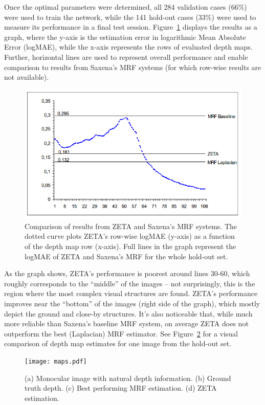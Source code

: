 \documentclass[twocolumn, 9pt]{jsproceedings}
\begin{document}
Once the optimal parameters were determined, all 284 validation cases (66\%) were used to train the network, while the 141 hold-out cases (33\%) were used to measure its performance in a final test session. Figure~\ref{fig:zeta} displays the results as a graph, where the y-axis is the estimation error in logarithmic Mean Absolute Error (logMAE), while the x-axis represents the rows of evaluated depth maps. Further, horizontal lines are used to represent overall performance and enable comparison to results from Saxena's MRF systems (for which row-wise results are not available).

\begin{figure}[h!]
\includegraphics[width=\columnwidth]{zeta.png}
\caption{Comparison of results from ZETA and Saxena's MRF systems. The dotted curve plots ZETA's row-wise logMAE (y-axis) as a function of the depth map row (x-axis). Full lines in the graph represent the logMAE of ZETA and Saxena's MRF for the whole hold-out set.}
\label{fig:zeta}
\end{figure}

As the graph shows, ZETA's performance is poorest around lines 30-60, which roughly corresponds to the ``middle'' of the images -- not surprisingly, this is the region where the most complex visual structures are found. ZETA's performance improves near the ``bottom'' of the images (right side of the graph), which mostly depict the ground and close-by structures. It's also noticeable that, while much more reliable than Saxena's baseline MRF system, on average ZETA does not outperform the best (Laplacian) MRF estimator. See Figure~\ref{fig:maps} for a visual comparison of depth map estimates for one image from the hold-out set.

\begin{figure}[h!]
\texttt{[image: maps.pdf]}
\caption{(a) Monocular image with natural depth information. (b) Ground truth depth. (c) Best performing MRF estimation. (d) ZETA estimation.}
\label{fig:maps}
\end{figure}
\end{document}
